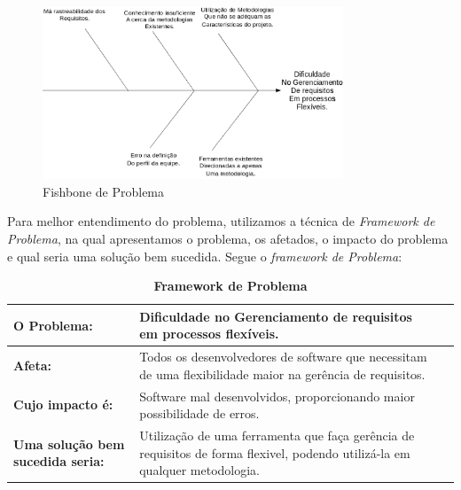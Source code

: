 \begin{figure}[!h]
	\centering
	\includegraphics[width=0.8\textwidth]{conteudo/fishbone}
	\caption{Fishbone de Problema}
\end{figure}

Para melhor entendimento do problema, utilizamos a técnica de \textit{Framework de Problema}, na qual apresentamos o problema, os afetados, o impacto do problema e qual seria uma solução bem sucedida. Segue o \textit{framework de Problema}:

\begin{table}[htbp]
\centering
\begin{tabular}{|p{2.5cm}|p{10cm}|p{2.5cm}|}
\hline
\textbf{O Problema:} & Dificuldade no Gerenciamento de requisitos em processos flexíveis. \\ \hline
\textbf{Afeta:} & Todos os desenvolvedores de software que necessitam de uma flexibilidade maior na gerência de requisitos. \\ \hline
\textbf{Cujo impacto é:} & Software mal desenvolvidos, proporcionando maior possibilidade de erros. \\ \hline
\textbf{Uma solução bem sucedida seria:} & Utilização de uma ferramenta que faça gerência de requisitos de forma flexivel, podendo utilizá-la em qualquer metodologia. \\ \hline
\end{tabular}
\label{}
\caption{\textbf{Framework de Problema}}
\end{table}


 	 	 	 	 
